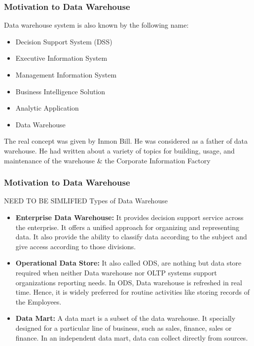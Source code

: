 \begin{frame}
\frametitle{Motivation to Data Warehouse}

Data warehouse system is also known by the following name:


\begin{itemize}
\item Decision Support System (DSS)
\item Executive Information System
\item Management Information System
\item Business Intelligence Solution
\item Analytic Application
\item Data Warehouse

\end{itemize}

The real concept was given by Inmon Bill. He was considered as a father of data warehouse. He had written about a variety of topics for building, usage, and maintenance of the warehouse \& the Corporate Information Factory

\end{frame}

\begin{frame}
\frametitle{Motivation to Data Warehouse}
NEED TO BE SIMLIFIED
Types of Data Warehouse
	\begin{itemize}
		\item \textbf{Enterprise Data Warehouse:} It provides decision support service across the enterprise. It offers a unified approach for organizing and representing data. It also provide the ability to classify data according to the subject and give access according to those divisions.
		\item \textbf{Operational Data Store:} It also called ODS, are nothing but data store required when neither Data warehouse nor OLTP systems support organizations reporting needs. In ODS, Data warehouse is refreshed in real time. Hence, it is widely preferred for routine activities like storing records of the Employees.
		\item \textbf{Data Mart:} A data mart is a subset of the data warehouse. It specially designed for a particular line of business, such as sales, finance, sales or finance. In an independent data mart, data can collect directly from sources.
	\end{itemize}

\end{frame}

